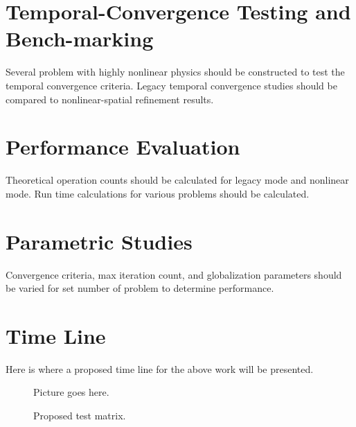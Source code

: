 \section{Temporal-Convergence Testing and Bench-marking}
\label{sect:proposal_temporal_testing}
Several problem with highly nonlinear physics should be constructed to test the temporal convergence criteria.
Legacy temporal convergence studies should be compared to nonlinear-spatial refinement results.

\section{Performance Evaluation}
\label{sect:proposal_performance_evaluation}
Theoretical operation counts should be calculated for legacy mode and nonlinear mode.
Run time calculations for various problems should be calculated.

\section{Parametric Studies}
\label{sect:proposal_parametric_studies}
Convergence criteria, max iteration count, and globalization parameters should be varied for set number of problem to determine performance.

\section{Time Line}
\label{sect:proposal_time_line}
Here is where a proposed time line for the above work will be presented.


\begin{figure}[ht]
\caption{Proposed test matrix.}
\label{fig:time_line}
\begin{center}
Picture goes here.
\end{center}
\end{figure}

